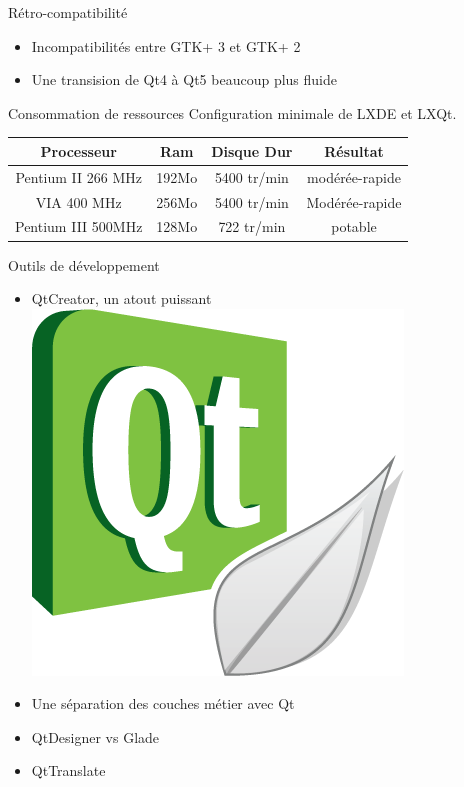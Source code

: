 \documentclass{beamer}
\begin{document}
\begin{frame}{Rétro-compatibilité}

	\begin{itemize}
	\item Incompatibilités entre GTK+ 3 et GTK+ 2 \pause
    \item Une transision de Qt4 à Qt5 beaucoup plus fluide
	\end{itemize}

\end{frame}

\begin{frame}{Consommation de ressources}
Configuration minimale de LXDE et LXQt.
	\begin{tabular}{|c|c|c|c|} \hline
    	Processeur & Ram & Disque Dur & Résultat \\ \hline
        Pentium II 266 MHz & 192Mo & 5400 tr/min & modérée-rapide \\ \hline
        VIA 400 MHz & 256Mo & 5400 tr/min & Modérée-rapide \\ \hline
        Pentium III 500MHz & 128Mo & 722 tr/min & potable \\ \hline
	\end{tabular}

\end{frame}

\begin{frame}{Outils de développement}

	\begin{itemize}
	\item QtCreator, un atout puissant \includegraphics[scale=0.05]{Pictures/Qtcreator.png} \pause
    \item Une séparation des couches métier avec Qt \pause
    \item QtDesigner vs Glade \pause
    \item QtTranslate 
	\end{itemize}

\end{frame}
\end{document}

